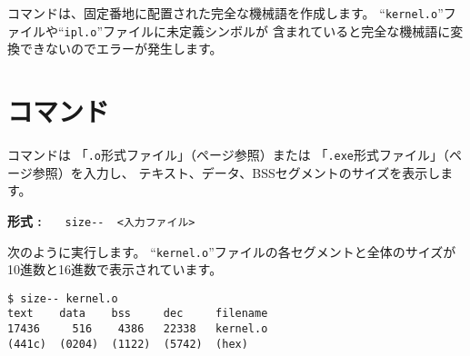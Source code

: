{\objbin}コマンドは、固定番地に配置された完全な機械語を作成します。
``\verb/kernel.o/''ファイルや``\verb/ipl.o/''ファイルに未定義シンボルが
含まれていると完全な機械語に変換できないのでエラーが発生します。

%

\section{{\size}コマンド}

{\size}コマンドは
「\verb/.o/形式ファイル」（\pageref{app:oformat}ページ参照）または
「\verb/.exe/形式ファイル」（\pageref{app:eformat}ページ参照）を入力し、
テキスト、データ、BSSセグメントのサイズを表示します。

\begin{flushleft}
{\bf 形式 : }~~~\verb/size--  <入力ファイル>/
\end{flushleft}

次のように実行します。
``\verb/kernel.o/''ファイルの各セグメントと全体のサイズが
10進数と16進数で表示されています。

\begin{mylist}
\begin{verbatim}
$ size-- kernel.o
text    data    bss     dec     filename
17436     516    4386   22338   kernel.o
(441c)  (0204)  (1122)  (5742)  (hex)
\end{verbatim}
\end{mylist}

